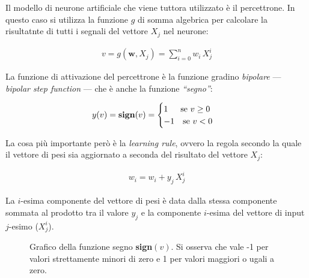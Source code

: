 Il modello di neurone artificiale che viene tuttora utilizzato è il percettrone. In questo caso si utilizza la funzione $g$ di somma algebrica per calcolare la risultatnte di tutti i segnali del vettore $X_j$ nel neurone:

\begin{gather*}
    v = g\left(\mathbf{w}, X_j\right) = \sum_{i = 0}^n w_i\,X_j^i
\end{gather*}

La funzione di attivazione del percettrone è la funzione gradino \textsl{bipolare} — \textit{bipolar step function} — che è anche la funzione \textsl{``segno''}:

\begin{gather*}
    y(v) = \text{\textbf{sign}}(v) =
    \begin{cases}
        1 \hspace{15px} \text{se } v\geq0\\
        -1 \hspace{10px} \text{se } v<0
    \end{cases}
\end{gather*}

La cosa più importante però è la \textsl{learning rule}, ovvero la regola secondo la quale il vettore di pesi sia aggiornato a seconda del risultato del vettore $X_j$:

\begin{gather*}
    w_i = w_i + y_j\,X_j^i
\end{gather*}

La $i$-esima componente del vettore di pesi è data dalla stessa componente sommata al prodotto tra il valore $y_j$ e la componente $i$-esima del vettore di input $j$-esimo ($X_j^i$).



\begin{figure}[!b]
    \centering
    
    \caption[Grafico della funzione segno \textbf{sign}$(v)$.]{Grafico della funzione segno \textbf{sign}$(v)$. Si osserva che vale -1 per valori strettamente minori di zero e 1 per valori maggiori o ugali a zero.}\label{fig:sign-function}
\end{figure}



